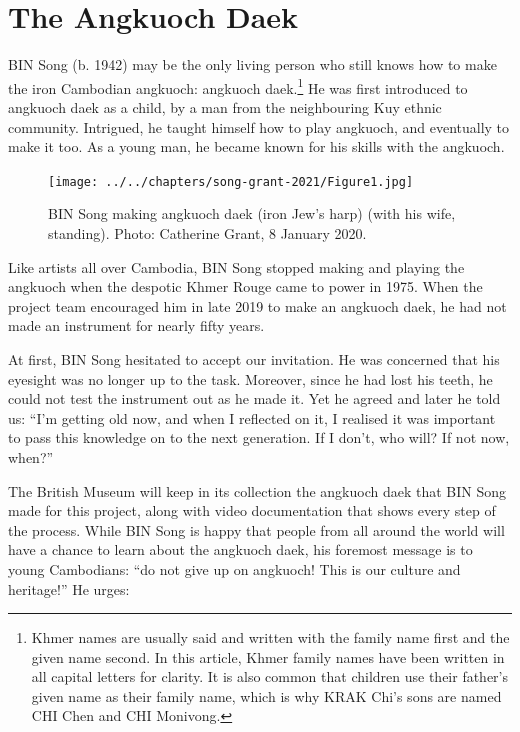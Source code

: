 \documentclass[twoside]{article}
\begin{document}
\hypertarget{the-angkuoch-daek}{%
\section*{The Angkuoch Daek}\label{the-angkuoch-daek}}

BIN Song (b. 1942) may be the only living person who still knows how to
make the iron Cambodian angkuoch: angkuoch daek.\footnote{Khmer names
  are usually said and written with the family name first and the given
  name second. In this article, Khmer family names have been written in
  all capital letters for clarity. It is also common that children use
  their father's given name as their family name, which is why KRAK
  Chi's sons are named CHI Chen and CHI Monivong.} He was first
introduced to angkuoch daek as a child, by a man from the neighbouring
Kuy ethnic community. Intrigued, he taught himself how to play angkuoch,
and eventually to make it too. As a young man, he became known for his
skills with the angkuoch.

\begin{figure}
  \texttt{[image: ../../chapters/song-grant-2021/Figure1.jpg]}
  \caption{BIN Song making angkuoch
  daek (iron Jew's harp) (with his wife, standing). Photo: Catherine
  Grant, 8 January 2020.}
\end{figure}

Like artists all over Cambodia, BIN Song stopped making and playing the
angkuoch when the despotic Khmer Rouge came to power in 1975. When the
project team encouraged him in late 2019 to make an angkuoch daek, he
had not made an instrument for nearly fifty years.

At first, BIN Song hesitated to accept our invitation. He was concerned
that his eyesight was no longer up to the task. Moreover, since he had
lost his teeth, he could not test the instrument out as he made it. Yet
he agreed and later he told us: ``I'm getting old now, and when I
reflected on it, I realised it was important to pass this knowledge on
to the next generation. If I don't, who will? If not now, when?''

The British Museum will keep in its collection the angkuoch daek that
BIN Song made for this project, along with video documentation that
shows every step of the process. While BIN Song is happy that people
from all around the world will have a chance to learn about the angkuoch
daek, his foremost message is to young Cambodians: ``do not give up on
angkuoch! This is our culture and heritage!'' He urges:
\end{document}
